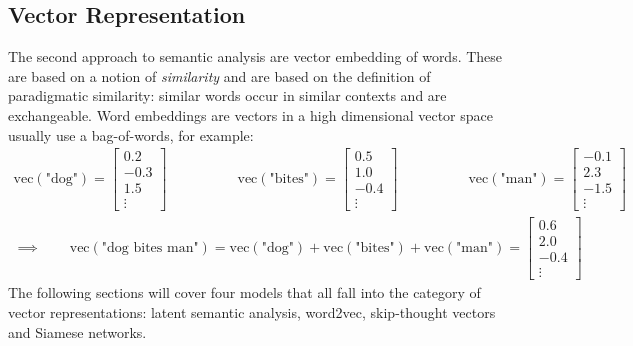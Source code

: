 		\subsection{Vector Representation}
			The second approach to semantic analysis are vector embedding of words. These are based on a notion of \emph{similarity} and are based on the definition of paradigmatic similarity: similar words occur in similar contexts and are exchangeable. Word embeddings are vectors in a high dimensional vector space usually use a bag-of-words, for example:
			\begin{gather}
				\mathrm{vec}(\text{"dog"}) = \begin{bmatrix} 0.2 \\ -0.3 \\ 1.5 \\ \vdots \end{bmatrix} \qquad\qquad\quad
				\mathrm{vec}(\text{"bites"}) = \begin{bmatrix} 0.5 \\ 1.0 \\ -0.4 \\ \vdots \end{bmatrix} \qquad\qquad\quad
				\mathrm{vec}(\text{"man"}) = \begin{bmatrix} -0.1 \\ 2.3 \\ -1.5 \\ \vdots \end{bmatrix} \\
				\implies\qquad
				\mathrm{vec}(\text{"dog bites man"})
				= \mathrm{vec}(\text{"dog"}) + \mathrm{vec}(\text{"bites"}) + \mathrm{vec}(\text{"man"})
				= \begin{bmatrix} 0.6 \\ 2.0 \\ -0.4 \\ \vdots \end{bmatrix}
			\end{gather}
			The following sections will cover four models that all fall into the category of vector representations: latent semantic analysis, word2vec, skip-thought vectors and Siamese networks.

